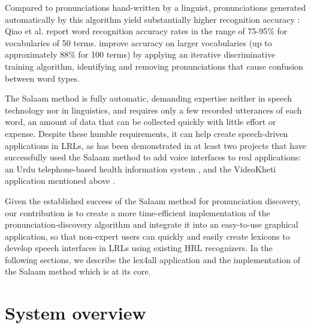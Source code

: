 \documentclass[11pt]{article}
\begin{document}
Compared to pronunciations hand-written by a linguist, pronunciations generated automatically by this algorithm yield substantially higher recognition accuracy \cite[Sec.~5.2]{Qiao10}: Qiao et al. report word recognition accuracy rates in the range of 75-95\% for vocabularies of 50 terms.
 improve accuracy on larger vocabularies (up to approximately 88\% for 100 terms) by applying an iterative discriminative training algorithm, identifying and removing pronunciations that cause confusion between word types.

The Salaam method is fully automatic, demanding expertise neither in speech technology 
nor in linguistics,
and requires only a few recorded utterances of each word,
an amount of data that can be collected quickly with little effort or expense. 
Despite these humble requirements, it 
can help create speech-driven applications in LRLs, as has been demonstrated in at least two projects that have successfully used the Salaam method to add voice interfaces to real applications: an Urdu telephone-based health information system \cite{Sherwani09}, and
the VideoKheti application mentioned above \cite{bali13}.



Given the established success of the Salaam method for pronunciation discovery, our contribution is to create a more time-efficient implementation of the pronunciation-discovery algorithm and integrate it into an easy-to-use graphical application, so that non-expert users can quickly and easily create lexicons to develop speech interfaces in LRLs using existing HRL recognizers. In the following sections, we describe the lex4all application and the implementation of the Salaam method which is at its core.


\section{System overview}
\label{sec:overview}
\end{document}
